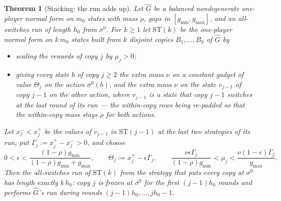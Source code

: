 \documentclass[11pt]{article}
\theoremstyle{plain}
\newtheorem{theorem}{Theorem}[section]
\theoremstyle{definition}
\begin{document}
\begin{theorem}[Stacking: the run adds up]\label{thm:stack}
Let $\widehat G$ be a balanced nondegenerate one-player normal form on $m_0$ states
with mass $\rho$, gaps in $[g_{\min},g_{\max}]$, and an all-switches run of length
$h_0$ from $\sigma^{0}$. For $k\ge1$ let $\mathrm{ST}(k)$ be the one-player normal form
on $k\,m_0$ states built from $k$ disjoint copies $B_1,\dots,B_k$ of $\widehat G$ by
\begin{itemize}[leftmargin=1.4em]
\item scaling the rewards of copy $j$ by $\mu_j>0$;
\item giving every state $b$ of copy $j\ge2$ the extra mass $\nu$ on a constant
      gadget of value $\Theta_j$ on the action $\sigma^{0}(b)$, and the extra mass
      $\nu$ on the state $v_{j-1}$ of copy $j-1$ on the other action, where $v_{j-1}$
      is a state that copy $j-1$ switches at the last round of its run --- the
      within-copy rows being re-padded so that the within-copy mass stays $\rho$ for
      both actions.
\end{itemize}
Let $x^{-}_j<x^{+}_j$ be the values of $v_{j-1}$ in $\mathrm{ST}(j-1)$ at the last two
strategies of its run, put $\Gamma_j:=x^{+}_j-x^{-}_j>0$, and choose
\[
  0<\epsilon<\frac{(1-\rho)g_{\min}}{(1-\rho)g_{\min}+g_{\max}},\qquad
  \Theta_j:=x^{+}_j-\epsilon\Gamma_j,\qquad
  \frac{\nu\epsilon\Gamma_j}{(1-\rho)g_{\min}}<\mu_j<\frac{\nu(1-\epsilon)\Gamma_j}{g_{\max}} .
\]
Then the all-switches run of $\mathrm{ST}(k)$ from the strategy that puts every copy at
$\sigma^{0}$ has length exactly $k\,h_0$: copy $j$ is frozen at $\sigma^{0}$ for the
first $(j-1)h_0$ rounds and performs $\widehat G$'s run during rounds
$(j-1)h_0,\dots,jh_0-1$.
\end{theorem}
\end{document}

